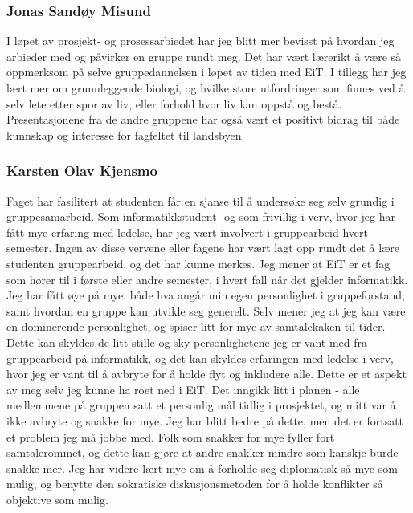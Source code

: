 \subsubsection{Jonas Sandøy Misund}
I løpet av prosjekt- og prosessarbiedet har jeg blitt mer bevisst på hvordan jeg arbieder med og påvirker en gruppe rundt meg.
Det har vært lærerikt å være så oppmerksom på selve gruppedannelsen i løpet av tiden med EiT.
I tillegg har jeg lært mer om grunnleggende biologi, og hvilke store utfordringer som finnes ved å selv lete etter spor av liv, eller forhold hvor liv kan oppstå og bestå.
Presentasjonene fra de andre gruppene har også vært et positivt bidrag til både kunnskap og interesse for fagfeltet til landsbyen.
\\
\subsubsection{Karsten Olav Kjensmo}
Faget har fasilitert at studenten får en sjanse til å undersøke seg selv grundig i gruppesamarbeid. 
Som informatikkstudent- og som frivillig i verv, hvor jeg har fått mye erfaring med ledelse, har jeg vært involvert i gruppearbeid hvert semester. 
Ingen av disse vervene eller fagene har vært lagt opp rundt det å lære studenten gruppearbeid, og det har kunne merkes. 
Jeg mener at EiT er et fag som hører til i første eller andre semester, i hvert fall når det gjelder informatikk. 
Jeg har fått øye på mye, både hva angår min egen personlighet i gruppeforstand, samt hvordan en gruppe kan utvikle seg generelt. 
Selv mener jeg at jeg kan være en dominerende personlighet, og spiser litt for mye av samtalekaken til tider. 
Dette kan skyldes de litt stille og sky personlighetene jeg er vant med fra gruppearbeid på informatikk, og det kan skyldes erfaringen med ledelse i verv, hvor jeg er vant til å avbryte for å holde flyt og inkludere alle. 
Dette er et aspekt av meg selv jeg kunne ha roet ned i EiT. Det inngikk litt i planen - alle medlemmene på gruppen satt et personlig mål tidlig i prosjektet, og mitt var å ikke avbryte og snakke for mye. 
Jeg har blitt bedre på dette, men det er fortsatt et problem jeg må jobbe med. 
Folk som snakker for mye fyller fort samtalerommet, og dette kan gjøre at andre snakker mindre som kanskje burde snakke mer. 
Jeg har videre lært mye om å forholde seg diplomatisk så mye som mulig, og benytte den sokratiske diskusjonsmetoden for å holde konflikter så objektive som mulig. 
\\
